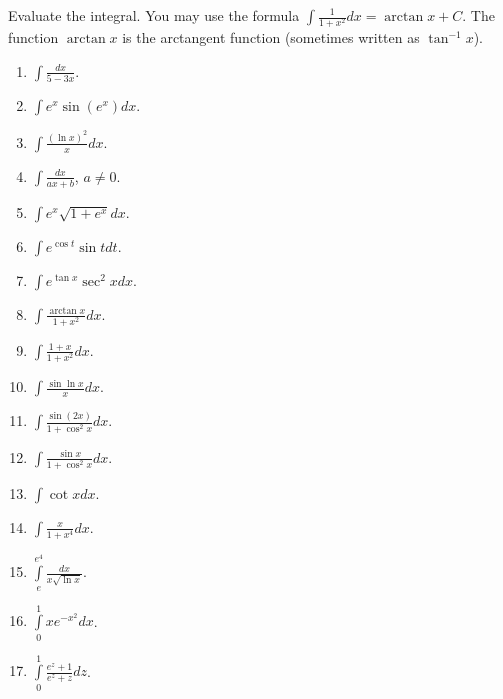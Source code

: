 \begin{problem}
Evaluate the integral. You may use the formula $\int \frac{1}{1+x^2}dx=\arctan x+C $. The function $\arctan x$ is the arctangent function (sometimes written as $\tan^{-1}x$).
\begin{multicols}{3}
\begin{enumerate}
\item $\displaystyle\int \frac{dx}{5-3x}$.
\item $\displaystyle\int e^x\sin (e^x) dx$.
\item $\displaystyle\int \frac{(\ln x)^2}{x} dx$.
\item $\displaystyle\int \frac{dx}{ax+b} $, $a\neq 0$.
\item $\displaystyle\int e^x\sqrt{1+e^x} dx$.
\item $\displaystyle\int e^{\cos t }\sin t dt$.
\item $\displaystyle\int e^{\tan x}\sec^2x dx$.
\item $\displaystyle\int \frac{\arctan x}{1+x^2} dx$. 
\item $\displaystyle\int \frac{1+x}{1+x^2} dx$. 
\item $\displaystyle\int \frac{\sin \ln x}{x} dx$.
\item $\displaystyle\int \frac{\sin (2x)}{1+\cos^2x}dx$.
\item $\displaystyle\int \frac{\sin x}{1+\cos^2 x} dx$.
\item $\displaystyle\int \cot x dx$.
\item $\displaystyle\int \frac{x}{1+x^4}dx$.
\item $\displaystyle\int\limits_{e}^{e^4}\frac{dx}{x\sqrt{\ln x}} $.
\item $\displaystyle\int\limits_{0}^{1}xe^{-x^2} dx$.
\item $\displaystyle\int\limits_{0}^{1}\frac{e^z+1}{e^z+z} dz$.
\end{enumerate}
\end{multicols}
\end{problem}